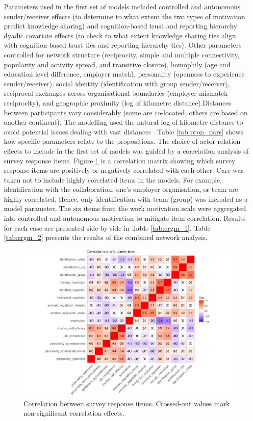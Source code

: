 Parameters used in the first set of models included controlled and autonomous sender/receiver effects (to determine to what extent the two types of motivation predict knowledge sharing) and cognition-based trust and reporting hierarchy dyadic covariate effects (to check to what extent knowledge sharing ties align with cognition-based trust ties and reporting hierarchy ties). Other parameters controlled for network structure (reciprocity, simple and multiple connectivity, popularity and activity spread, and transitive closure), homophily (age and education level difference, employer match), personality (openness to experience sender/receiver), social identity (identification with group sender/receiver), reciprocal exchanges across organisational boundaries (employer mismatch reciprocity), and geographic proximity (log of kilometre distance).Distances between participants vary considerably (some are co-located, others are based on another continent). The modelling used the natural log of kilometre distance to avoid potential issues dealing with vast distances \citep{daraganova2012networks}. Table \ref{tab:prop_pars} shows how specific parameters relate to the propositions. The choice of actor-relation effects to include in the first set of models was guided by a correlation analysis of survey response items. Figure \ref{fig:corr_analysis} is a correlation matrix showing which survey response items are positively or negatively correlated with each other. Care was taken not to include highly correlated items in the models. For example, identification with the collaboration, one's employer organisation, or team are highly correlated. Hence, only identification with team (group) was included as a model parameter. The six items from the work motivation scale were aggregated into controlled and autonomous motivation to mitigate item correlation. Results for each case are presented side-by-side in Table \ref{tab:ergm_1}. Table \ref{tab:ergm_2} presents the results of the combined network analysis. \medskip

\begin{figure}
    \centering
    \includegraphics[width = \textwidth]{Images/corr_plot.pdf}
    \caption[Correlation between survey response items]{Correlation between survey response items. Crossed-out values mark non-significant correlation effects.}
    \label{fig:corr_analysis}
\end{figure}


